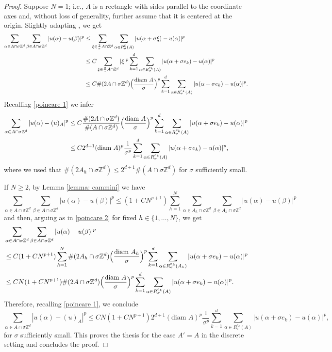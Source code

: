 \documentclass{article}
\theoremstyle{plain}
\theoremstyle{definition}
\def\e{\varepsilon}
\def\ZZ{{\mathbb Z}}
\newcommand{\s}{\sigma}
\numberwithin{equation}{section}
\begin{document}
\begin{proof}
Suppose $N=1$; i.e., $A$ is a rectangle with sides parallel to the coordinate axes and, without loss of generality, further assume that it is centered at the origin. Slightly adapting \cite[Lemma 3.6]{AliCic}, we get
\begin{align} \notag
    \sum_{\alpha\in A\cap\s\ZZ^d}\sum_{\beta \in A\cap\s\ZZ^d}|u(\alpha)-u(\beta)|^p
    & \leq \sum_{\xi\in \frac{2}{\s}A \cap\ZZ^d} \sum_{\alpha\in R_\s^{\xi}(A)}|u(\alpha+\s\xi)-u(\alpha)|^p \\ \notag
    & \leq C \sum_{\xi\in \frac{2}{\s}A \cap\ZZ^d} |\xi|^p\sum_{k=1}^d\sum_{\alpha\in R_\s^{e_k}(A)}|u(\alpha+\s e_k)-u(\alpha)|^p \\ \label{poincare 2}
    & \leq  C\#(2 A\cap \s\ZZ^d) \Bigl(\frac{\text{diam } A}{\s}\Bigr)^p\sum_{k=1}^d\sum_{\alpha\in R_\s^{e_k}(A)}|u(\alpha+\s e_k)-u(\alpha)|^p.
\end{align}
Recalling \eqref{poincare 1} we infer
\begin{align*}
   \sum_{\alpha\in  A\cap\s\ZZ^d}|u(\alpha)-(u)_A|^p 
    & \leq  C\frac{\#(2 A\cap \s\ZZ^d) }{\# (A\cap\s\ZZ^d)}\Bigl(\frac{\text{diam } A}{\s}\Bigr)^p\sum_{k=1}^d\sum_{\alpha\in R_\s^{e_k}(A)}|u(\alpha+\s e_k)-u(\alpha)|^p \\
    & \leq C 2^{d+1} (\text{diam } A)^p\frac{1}{\s^p}\sum_{k=1}^d\sum_{\alpha\in R_\s^{e_k}(A)}|u(\alpha+\s e_k)-u(\alpha)|^p,
\end{align*}
where we used that $\#(2 A_h\cap \s\ZZ^d)\leq 2^{d+1}\#(A\cap \s\ZZ^d)$ for $\s$ sufficiently small. 

If $N\geq 2$, by Lemma \ref{lemma: cammini} we have
\begin{equation*}
      \sum_{\alpha\in A\cap\s\ZZ^d}\sum_{\beta \in A\cap\s\ZZ^d}|u(\alpha)-u(\beta)|^p\leq (1+CN^{p+1})\sum_{h=1}^N\sum_{\alpha\in A_h\cap\s\ZZ^d}\sum_{\beta \in A_h\cap\s\ZZ^d}|u(\alpha)-u(\beta)|^p
\end{equation*}
and then, arguing as in \eqref{poincare 2} for fixed $h\in\{1,\dots,N\}$, we get
\begin{align*}
 &\sum_{\alpha\in A\cap\s\ZZ^d}\sum_{\beta \in A\cap\s\ZZ^d}|u(\alpha)-u(\beta)|^p \\ &\leq C(1+CN^{p+1})\sum_{h=1}^N
    \#(2 A_h\cap \s\ZZ^d) \Bigl(\frac{\text{diam } A_h}{\s}\Bigr)^p\sum_{k=1}^d\sum_{\alpha\in R_\s^{e_k}(A_h)}|u(\alpha+\s e_k)-u(\alpha)|^p \\
    & \leq CN(1+CN^{p+1})\#(2 A\cap \s\ZZ^d) \Bigl(\frac{\text{diam } A}{\s}\Bigr)^p\sum_{k=1}^d\sum_{\alpha\in R_\s^{e_k}(A)}|u(\alpha+\s e_k)-u(\alpha)|^p.
\end{align*}
Therefore, recalling \eqref{poincare 1}, we conclude
\begin{equation*}
        \sum_{\alpha\in  A\cap\s\ZZ^d}|u(\alpha)-(u)_A|^p \leq CN(1+CN^{p+1})2^{d+1}(\text{diam } A)^p \frac{1}{\s^p}\sum_{k=1}^d\sum_{\alpha\in R_\e^{e_k}(A)}|u(\alpha+\s e_k)-u(\alpha)|^p,
    \end{equation*}
for $\s$ sufficiently small. This proves the thesis for the case $A'=A$ in the discrete setting and concludes the proof.
\end{proof}
\end{document}
